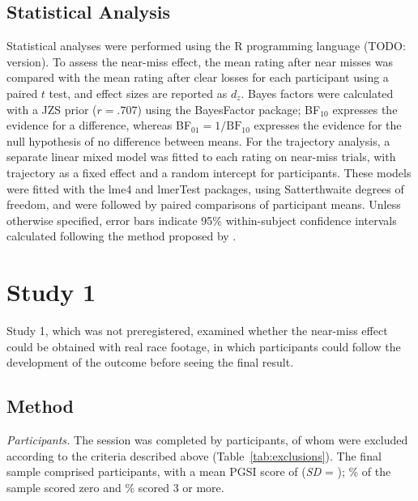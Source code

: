 \documentclass[man,floatsintext,donotrepeattitle]{apa7}
\begin{document}
\begin{table}[htbp]
\caption{Problem Gambling Severity Index (PGSI) Scores of Analyzed Participants}
\label{tab:pgsi}
\resizebox{\linewidth}{!}{}
\end{table}

\subsection{Statistical Analysis}
Statistical analyses were performed using the R programming language (TODO: version). To assess the
near-miss effect, the mean rating after near misses was compared with the mean rating after clear
losses for each participant using a paired $t$ test, and effect sizes are reported as $d_z$. Bayes
factors were calculated with a JZS prior ($r = .707$) using the BayesFactor package; BF$_{10}$
expresses the evidence for a difference, whereas BF$_{01} = 1/\text{BF}_{10}$ expresses the evidence
for the null hypothesis of no difference between means. For the trajectory analysis, a separate
linear mixed model was fitted to each rating on near-miss trials, with trajectory as a fixed effect
and a random intercept for participants. These models were fitted with the lme4 and lmerTest
packages, using Satterthwaite degrees of freedom, and were followed by paired comparisons of
participant means. Unless otherwise specified, error bars indicate 95\% within-subject
confidence intervals calculated following the method proposed by \textcite{morey2008}.

\section{Study 1}
Study 1, which was not preregistered, examined whether the near-miss effect could be obtained with
real race footage, in which participants could follow the development of the outcome before seeing
the final result.

\subsection{Method}
\textit{Participants.} The session was completed by  participants, of whom
 were excluded according to the criteria described above (Table~\ref{tab:exclusions}).
The final sample comprised  participants, with a mean PGSI score of 
(\textit{SD} = ); \% of the sample scored zero and
\% scored 3 or more.
\end{document}
